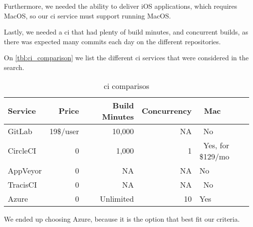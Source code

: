 Furthermore, we needed the ability to deliver iOS applications, which requires MacOS, so our \gls{ci} service must support running MacOS. 

Lastly, we needed a \gls{ci} that had plenty of build minutes, and concurrent builds, as there was expected many commits each day on the different repositories.

On \autoref{tbl:ci_comparison} we list the different \gls{ci} services that were considered in the search. 

\noindent\begin{longtable}[]{@{}lrrrl@{}}
    \caption{\gls{ci} comparisos}
    \label{tbl:ci_comparison}\\
    \toprule
    Service & Price & ~Build Minutes & Concurrency & ~Mac\tabularnewline
    \midrule
    \endhead
    GitLab & 19\$/user & 10,000 & NA & ~No\tabularnewline
    CircleCI & 0 & 1,000 & 1 & ~Yes, for \$129/mo\tabularnewline
    AppVeyor & 0 & ~ NA & NA & No\tabularnewline
    TracisCI & ~ 0 & ~ NA & ~ NA & ~No ~\tabularnewline
    Azure & 0 & ~ Unlimited & ~10 & Yes\tabularnewline
    \bottomrule
\end{longtable}

We ended up choosing Azure, because it is the option that best fit our criteria. 
